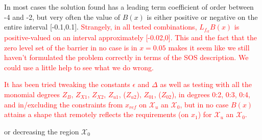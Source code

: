 %
%
%
%
%
In most cases the solution found has a leading term coefficient of order between -4 and -2, but very often the value of $B(x)$ is either positive or negative on the entire interval [-0.1,0.1]. \textcolor{red}{Strangely, in all tested combinations, $L_{f_{cl}}B(x)$ is positive-valued on an interval approximately [-0.02,0]. This and the fact that the zero level set of the barrier in no case is in $x=0.05$ makes it seem like we still haven't formulated the problem correctly in terms of the SOS description. We could use a little help to see what we do wrong.} 
%
%

\textcolor{red}{It has been tried tweaking the constants $\epsilon$ and $\Delta$ as well as testing with all the monomial degrees $Z_B$, $Z_{X1}$, $Z_{X2}$, $Z_{u1}$, ($Z_{u2}$), $Z_{01}$, ($Z_{02}$), in degrees 0:2, 0:3, 0:4, and in/excluding the constraints from $x_{ref}$ on $\mathcal{X}_u$ an $\mathcal{X}_0$, but in no case $B(x)$ attains a shape that remotely reflects the requirements (on $x_1$) for $\mathcal{X}_u$ an $\mathcal{X}_0$.}


or decreasing the region $\mathcal{X}_0$